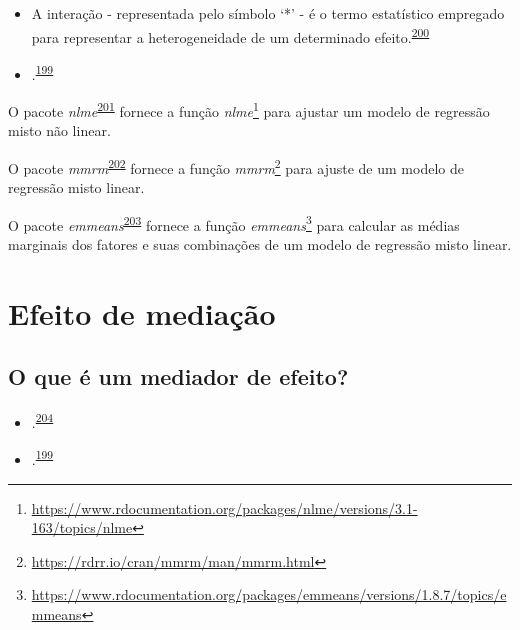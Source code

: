 \documentclass[
  a4paper,
]{book}
\renewcommand{\href}[2]{#2\footnote{\url{#1}}}
\newenvironment{infobox}[1]
  {
  \begin{itemize}
  \renewcommand{\labelitemi}{
    \raisebox{-.7\height}[0pt][0pt]{
      {\setkeys{Gin}{width=3em,keepaspectratio}
        \texttt{[image: \#1]}}
    }
  }
  \setlength{\fboxsep}{1em}
  \begin{blackbox}
  \item
  }
  {
  \end{blackbox}
  \end{itemize}
  }
\begin{document}
\begin{itemize}
\item
  A interação - representada pelo símbolo `*' - é o termo estatístico empregado para representar a heterogeneidade de um determinado efeito.\textsuperscript{\protect\hyperlink{ref-Altman1996}{200}}
\item
  .\textsuperscript{\protect\hyperlink{ref-Bours2023}{199}}
\end{itemize}

\begin{infobox}{images/Rlogo}
O pacote \emph{nlme}\textsuperscript{\protect\hyperlink{ref-nlme}{201}} fornece a função \href{https://www.rdocumentation.org/packages/nlme/versions/3.1-163/topics/nlme}{\emph{nlme}} para ajustar um modelo de regressão misto não linear.

\end{infobox}

\begin{infobox}{images/Rlogo}
O pacote \emph{mmrm}\textsuperscript{\protect\hyperlink{ref-mmrm}{202}} fornece a função \href{https://rdrr.io/cran/mmrm/man/mmrm.html}{\emph{mmrm}} para ajuste de um modelo de regressão misto linear.

\end{infobox}

\begin{infobox}{images/Rlogo}
O pacote \emph{emmeans}\textsuperscript{\protect\hyperlink{ref-emmeans}{203}} fornece a função \href{https://www.rdocumentation.org/packages/emmeans/versions/1.8.7/topics/emmeans}{\emph{emmeans}} para calcular as médias marginais dos fatores e suas combinações de um modelo de regressão misto linear.

\end{infobox}

\hypertarget{mediacao}{%
\section{Efeito de mediação}\label{mediacao}}

\hypertarget{o-que-uxe9-um-mediador-de-efeito}{%
\subsection{O que é um mediador de efeito?}\label{o-que-uxe9-um-mediador-de-efeito}}

\begin{itemize}
\item
  .\textsuperscript{\protect\hyperlink{ref-Baron1986}{204}}
\item
  .\textsuperscript{\protect\hyperlink{ref-Bours2023}{199}}
\end{itemize}
\end{document}
